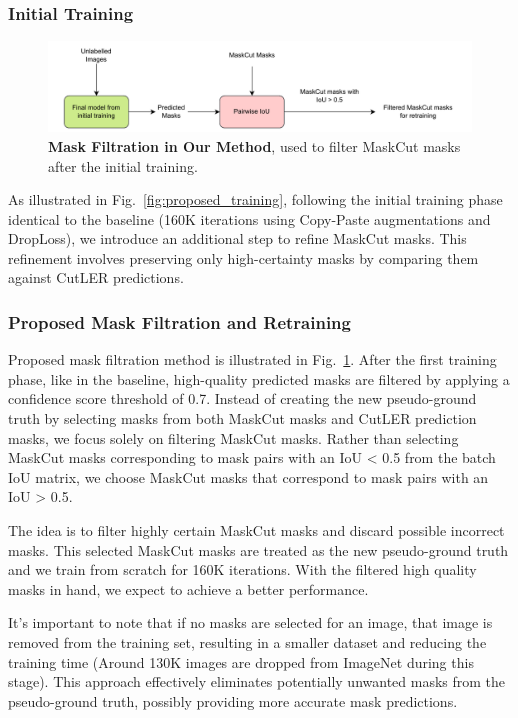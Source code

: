 \subsubsection{Initial Training}
\begin{figure}
	\centering
	\includegraphics[width=1\textwidth]{Images/main/our_mask_filtration_1.pdf}
	\caption[\textbf{Mask Filtration in Proposed Method}]{\textbf{Mask Filtration in Our Method}, used to filter MaskCut masks after the initial training.}
	\label{fig:our_mask_filtration}
\end{figure}

As illustrated in Fig.~\ref{fig:proposed_training}, following the initial training phase identical to the baseline (160K iterations using Copy-Paste augmentations and DropLoss), we introduce an additional step to refine MaskCut masks. This refinement involves preserving only high-certainty masks by comparing them against CutLER predictions.

\subsubsection{Proposed Mask Filtration and Retraining}
Proposed mask filtration method is illustrated in Fig.~\ref{fig:our_mask_filtration}. After the first training phase, like in the baseline, high-quality predicted masks are filtered by applying a confidence score threshold of 0.7.  Instead of creating the new pseudo-ground truth by selecting masks from both MaskCut masks and CutLER prediction masks, we focus solely on filtering MaskCut masks. Rather than selecting MaskCut masks corresponding to mask pairs with an IoU < 0.5 from the batch IoU matrix, we choose MaskCut masks that correspond to mask pairs with an IoU > 0.5. 

The idea is to filter highly certain MaskCut masks and discard possible incorrect masks. This selected MaskCut masks are treated as the new pseudo-ground truth and we train from scratch for 160K iterations. With the filtered high quality masks in hand, we expect to achieve a better performance. 

It’s important to note that if no masks are selected for an image, that image is removed from the training set, resulting in a smaller dataset and reducing the training time (Around 130K images are dropped from ImageNet during this stage). This approach effectively eliminates potentially unwanted masks from the pseudo-ground truth, possibly providing more accurate mask predictions.

